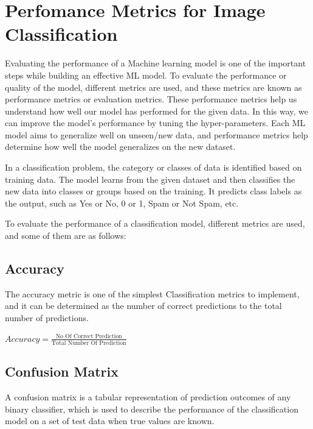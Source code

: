 \section{Perfomance Metrics for Image Classification}
Evaluating the performance of a Machine learning model is one of the important steps while building an effective ML model. To evaluate the performance or quality of the model, different metrics are used, and these metrics are known as performance metrics or evaluation metrics. These performance metrics help us understand how well our model has performed for the given data. In this way, we can improve the model's performance by tuning the hyper-parameters. Each ML model aims to generalize well on unseen/new data, and performance metrics help determine how well the model generalizes on the new dataset\cite{c-eval}.
\par \vspace{1em}
In a classification problem, the category or classes of data is identified based on training data. The model learns from the given dataset and then classifies the new data into classes or groups based on the training. It predicts class labels as the output, such as Yes or No, 0 or 1, Spam or Not Spam, etc. \par \vspace{1em}

To evaluate the performance of a classification model, different metrics are used, and some of them are as follows:

    \subsection{Accuracy}
    The accuracy metric is one of the simplest Classification metrics to implement, and it can be determined as the number of correct predictions to the total number of predictions.

    \begin{center}
        \(\displaystyle{Accuracy = \frac{\text{No Of Correct Prediction}}{\text{Total Number Of Prediction}}}\) 
    \end{center}


    \subsection{Confusion Matrix}
    A confusion matrix is a tabular representation of prediction outcomes of any binary classifier, which is used to describe the performance of the classification model on a set of test data when true values are known.

